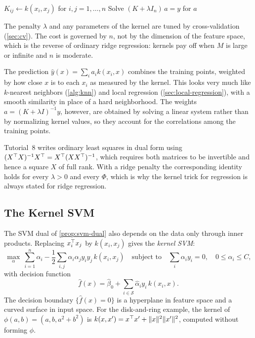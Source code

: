 \begin{algorithm}[H]
\caption{Kernel Ridge Regression}\label{alg:kernel-ridge}
\begin{algorithmic}[1]
\State $K_{ij}\gets k(x_i,x_j)$ for $i,j=1,\dots,n$ 
\State Solve $(K+\lambda I_n)\,a=y$ for $a$ 
\end{algorithmic}
\end{algorithm}

The penalty $\lambda$ and any parameters of the kernel are tuned by cross-validation (\cref{sec:cv}). The cost is governed by $n$, not by the dimension of the feature space, which is the reverse of ordinary ridge regression: kernels pay off when $M$ is large or infinite and $n$ is moderate.

\begin{remark}\label{rem:kernel-knn}
The prediction $\hat y(x)=\sum_ia_ik(x_i,x)$ combines the training points, weighted by how close $x$ is to each $x_i$ as measured by the kernel. This looks very much like $k$-nearest neighbors (\cref{alg:knn}) and local regression (\cref{sec:local-regression}), with a smooth similarity in place of a hard neighborhood. The weights $a=(K+\lambda I)^{-1}y$, however, are obtained by solving a linear system rather than by normalizing kernel values, so they account for the correlations among the training points.
\end{remark}

\begin{remark}
Tutorial~8 writes ordinary least squares in dual form using $(X^{\top} X)^{-1}X^{\top}=X^{\top}(XX^{\top})^{-1}$, which requires both matrices to be invertible and hence a square $X$ of full rank. With a ridge penalty the corresponding identity holds for every $\lambda>0$ and every $\Phi$, which is why the kernel trick for regression is always stated for ridge regression.
\end{remark}

\subsection{The Kernel SVM}\label{sec:kernel-svm}

The SVM dual of \cref{prop:svm-dual} also depends on the data only through inner products. Replacing $x_i^{\top} x_j$ by $k(x_i,x_j)$ gives the \emph{kernel SVM}:
\[
\max_\alpha\ \sum_{i=1}^n\alpha_i-\frac12\sum_{i,j}\alpha_i\alpha_jy_iy_j\,k(x_i,x_j)\quad\text{subject to}\quad\sum_i\alpha_iy_i=0,\quad0\le\alpha_i\le C,
\]
with decision function
\[
\hat f(x)=\hat\beta_0+\sum_{i\in\mathcal S}\hat\alpha_iy_i\,k(x_i,x).
\]
The decision boundary $\{\hat f(x)=0\}$ is a hyperplane in feature space and a curved surface in input space. For the disk-and-ring example, the kernel of $\phi(a,b)=(a,b,a^2+b^2)$ is $k(x,x')=x^{\top} x'+\lVert x\rVert^2\lVert x'\rVert^2$, computed without forming $\phi$.

